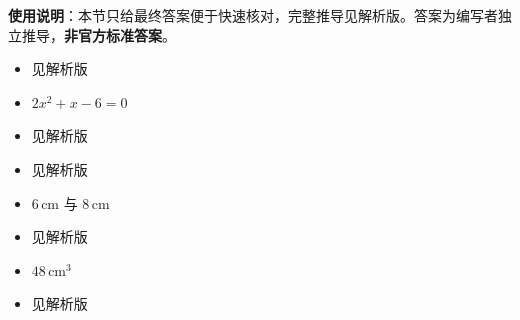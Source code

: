 
\begin{gknotice}
\textbf{使用说明}：本节只给最终答案便于快速核对，完整推导见解析版。答案为编写者独立推导，\textbf{非官方标准答案}。
\end{gknotice}

\begin{itemize}[leftmargin=2.6em]
  \item[\textbf{1.}] 见解析版
  \item[\textbf{2.}] $2x^2+x-6=0$
  \item[\textbf{3.}] 见解析版
  \item[\textbf{4.}] 见解析版
  \item[\textbf{5.}] $6\,\text{cm}$ 与 $8\,\text{cm}$
  \item[\textbf{6.}] 见解析版
  \item[\textbf{7.}] $48\,\text{cm}^3$
  \item[\textbf{8.}] 见解析版
\end{itemize}

